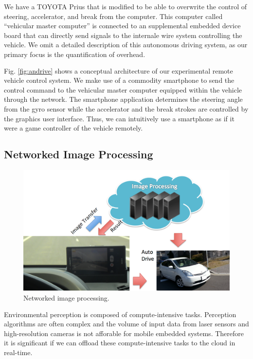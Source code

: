 We have a TOYOTA Prius that is modified to be able to overwrite the
control of steering, accelerator, and break from the computer.
This computer called ``vehicular master computer'' is connected to an
supplemental embedded device board that can directly send signals to the
internale wire system controlling the vehicle.
We omit a detailed description of this autonomous driving system, as our
primary focus is the quantification of overhead.

Fig. \ref{fig:andrive} shows a conceptual architecture of our
experimental remote vehicle control system.
We make use of a commodity smartphone to send the control command to the
vehicular master computer equipped within the vehicle through the network.
The smartphone application determines the steering angle from the gyro
sensor while the accelerator and the break strokes are controlled by the
graphics user interface.
Thus, we can intuitively use a smartphone as if it were a game
controller of the vehicle remotely.

\subsection{Networked Image Processing}

\begin{figure}[!t]
 \centering
 \includegraphics[width=0.9\hsize]{fig/TIPIC.pdf}
 \caption{Networked image processing.}
 \label{fig:tipic}
\end{figure}

Environmental perception is composed of compute-intensive tasks.
Perception algorithms are often complex and the volume of input data
from laser sensors and high-resolution cameras is not afforable for
mobile embedded systems.
Therefore it is significant if we can offload these compute-intensive
tasks to the cloud in real-time.

